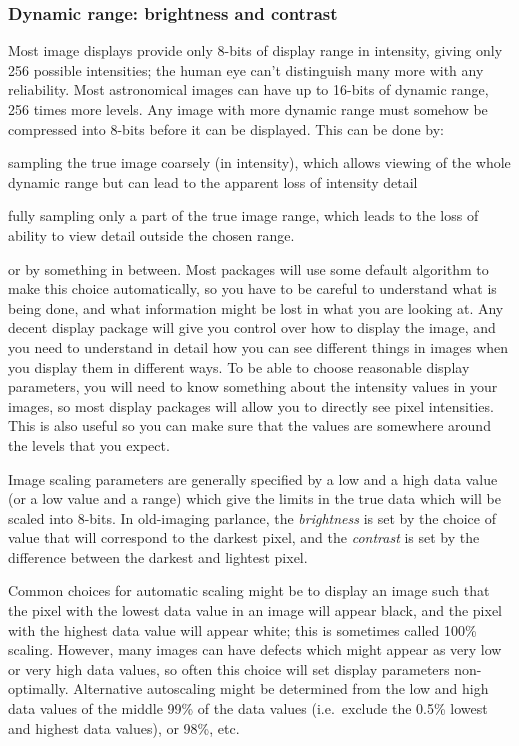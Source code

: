 \documentclass{article}
\begin{document}
\subsubsection*{Dynamic range: brightness and contrast}
Most image displays provide only 8-bits of display range in intensity,
giving only 256 possible intensities; the human eye can't
distinguish many more with any reliability. Most
astronomical images can have up to 16-bits of dynamic range, 256 times
more levels. Any image with more dynamic range must somehow be
compressed into 8-bits before it can be displayed. This can be done
by:
\begin{itemize*}
    \item sampling the true image coarsely (in intensity), which
        allows viewing of the whole dynamic range but can lead to the apparent
        loss of intensity detail
    \item fully sampling only a part of the true image range,
        which leads to the loss of ability to view detail outside
        the chosen range.
\end{itemize*}
or by something in between. Most packages will use
some default algorithm to make this choice automatically, so you have
to be careful to understand what is being done, and what information
might be lost in what you are looking at. Any decent display package
will give you control over how to display the image, and you need to
understand in detail how you can see different things in images when
you display them in different ways. To be able to choose reasonable
display parameters, you will need to know something about the
intensity values in your images, so most display packages will allow
you to directly see pixel intensities. This is also useful so you can
make sure that the values are somewhere around the levels that you
expect.

Image scaling parameters are generally specified by a low and a high
data value (or a low value and a range) which give the limits in the
true data which will be scaled into 8-bits. In old-imaging parlance,
the \emph{brightness} is set by the choice of value that will correspond to
the darkest pixel, and the \emph{contrast} is set by the difference between
the darkest and lightest pixel.

Common choices for automatic scaling might be to display an image such
that the pixel with the lowest data value in an image will appear
black, and the pixel with the highest data value will appear white;
this is sometimes called 100\% scaling. However, many images can have
defects which might appear as very low or very high data values, so
often this choice will set display parameters non-optimally.
Alternative autoscaling might be determined from the low and high data
values of the middle 99\% of the data values (i.e.\ exclude the 0.5\%
lowest and highest data values), or 98\%, etc.
\end{document}
